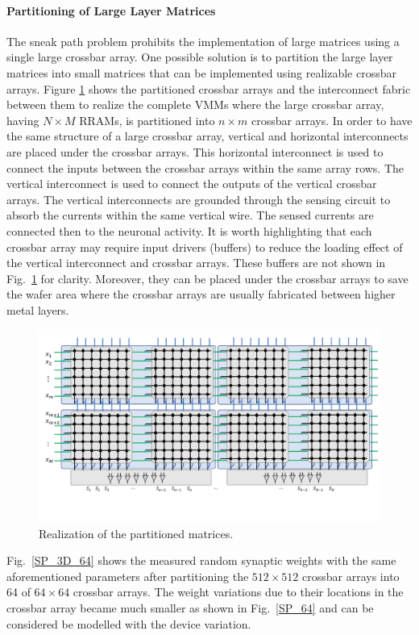 \documentclass[english]{article}
\newcommand{\reffig}[1]{{Fig.~\ref{#1}}}
\begin{document}
\paragraph{Partitioning of Large Layer Matrices}
The sneak path problem prohibits the implementation of large matrices using a single large crossbar array. One possible solution is to partition the large layer matrices into small matrices that can be implemented using realizable crossbar arrays. Figure \ref{fig:partioning} shows the partitioned crossbar arrays and the interconnect fabric between them to realize the complete VMMs where the large crossbar array, having $N\times M$ RRAMs, is partitioned into $n\times m$ crossbar arrays.
In order to have the same structure of a large crossbar array, vertical and horizontal interconnects are placed under the crossbar arrays. This horizontal interconnect is used to connect the inputs between the crossbar arrays within the same array rows. The vertical interconnect is used to connect the outputs of the vertical crossbar arrays. The vertical interconnects are grounded through the sensing circuit to absorb the currents within the same vertical wire. The sensed currents are connected then to the neuronal activity. It is worth highlighting that each crossbar array may require input drivers (buffers) to reduce the loading effect of the vertical interconnect and crossbar arrays. These buffers are not shown in \reffig{fig:partioning} for clarity.  Moreover, they can be placed under the crossbar arrays to save the wafer area where the crossbar arrays are usually fabricated between higher metal layers.   %
\begin{figure}[!h]
\centering
\includegraphics[width=\linewidth]{Partition}%
\caption{Realization of the partitioned matrices. 
\label{fig:partioning}
  }
\end{figure}   
%
\reffig{SP_3D_64} shows the measured random synaptic weights with the same aforementioned parameters after partitioning the $512\times 512$ crossbar arrays into 64 of $64\times 64$ crossbar arrays. The weight variations due to their locations in the crossbar array became much smaller as shown in \reffig{SP_64} and can be considered be modelled with the device variation.  
\end{document}
